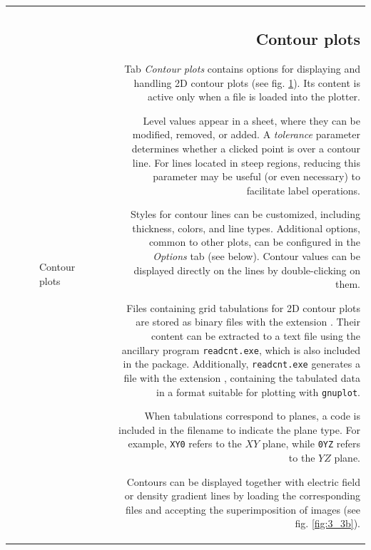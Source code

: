 \documentclass[10pt]{article}
\begin{document}
\begin{tabular}{lr}
\begin{minipage}{.5\linewidth}
\begin{figure}[H]
\begin{center}
\end{center}
\caption{Contour plots \label{fig:3_3c}}
\end{figure}
\end{minipage}
&
\begin{minipage}{.5\linewidth}

\subsection{Contour plots \label{sec:3.1}\index{2D graphics!contour plots}}

Tab {\it Contour plots} contains options for displaying and handling 2D contour plots  
(see fig. \ref{fig:3_3c}). Its content is active only when a \cnt{ } file is loaded into the plotter.  

Level values appear in a sheet, where they can be modified, removed, or added.  
A {\it tolerance} parameter determines whether a clicked point is over a contour line.  
For lines located in steep regions, reducing this parameter may be useful  
(or even necessary) to facilitate label operations.  

Styles for contour lines can be customized, including thickness, colors, and line types.  
Additional options, common to other plots, can be configured in the {\it Options} tab (see below).  
Contour values can be displayed directly on the lines by double-clicking on them.  

Files containing grid tabulations for 2D contour plots are stored as binary files  
with the extension \cnt{}. Their content can be extracted to a text file using  
the ancillary program \texttt{readcnt.exe}, which is also included in the package.  
Additionally, \texttt{readcnt.exe} generates a file with the extension \gnu{ },  
containing the tabulated data in a format suitable for plotting with \texttt{gnuplot}.  

When tabulations correspond to planes, a code is included in the filename to indicate the plane type.  
For example, \texttt{XY0} refers to the $XY$ plane, while \texttt{0YZ} refers to the $YZ$ plane.  

Contours can be displayed together with electric field or density gradient lines  
by loading the corresponding files and accepting the superimposition of images  
(see fig. \ref{fig:3_3b}).  




\end{minipage}
\end{tabular}
\end{document}
